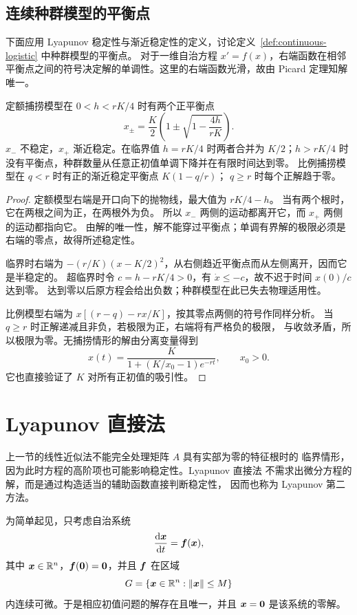 \subsection*{连续种群模型的平衡点}
下面应用 Lyapunov 稳定性与渐近稳定性的定义，讨论定义~\ref{def:continuous-logistic} 中种群模型的平衡点。
对于一维自治方程 $x'=f(x)$，右端函数在相邻平衡点之间的符号决定解的单调性。这里的右端函数光滑，故由 Picard 定理知解唯一。
\begin{proposition}[捕捞阈值]\label{prop:harvest-threshold}
定额捕捞模型在 $0<h<rK/4$ 时有两个正平衡点
\[
 x_\pm=\frac K2\left(1\pm\sqrt{1-\frac{4h}{rK}}\right).
\]
$x_-$ 不稳定，$x_+$ 渐近稳定。在临界值 $h=rK/4$ 时两者合并为
$K/2$；$h>rK/4$ 时没有平衡点，种群数量从任意正初值单调下降并在有限时间达到零。
比例捕捞模型在 $q<r$ 时有正的渐近稳定平衡点 $K(1-q/r)$；
$q\geq r$ 时每个正解趋于零。
\end{proposition}
\begin{proof}
定额模型右端是开口向下的抛物线，最大值为 $rK/4-h$。
当有两个根时，它在两根之间为正，在两根外为负。
所以 $x_-$ 两侧的运动都离开它，而 $x_+$ 两侧的运动都指向它。
由解的唯一性，解不能穿过平衡点；单调有界解的极限必须是右端的零点，故得所述稳定性。

临界时右端为 $-(r/K)(x-K/2)^2$，从右侧趋近平衡点而从左侧离开，因而它是半稳定的。
超临界时令 $c=h-rK/4>0$，有 $\dot x\leq-c$，故不迟于时间 $x(0)/c$ 达到零。
达到零以后原方程会给出负数；种群模型在此已失去物理适用性。

比例模型右端为 $x[(r-q)-rx/K]$，按其零点两侧的符号作同样分析。
当 $q\geq r$ 时正解递减且非负，若极限为正，右端将有严格负的极限，
与收敛矛盾，所以极限为零。无捕捞情形的解由分离变量得到
\[
 x(t)=\frac{K}{1+(K/x_0-1)e^{-rt}},\qquad x_0>0.
\]
它也直接验证了 $K$ 对所有正初值的吸引性。
\end{proof}

\section{Lyapunov 直接法}\label{sec:Lyapunov直接法}

上一节的线性近似法不能完全处理矩阵 $A$ 具有实部为零的特征根时的
临界情形，因为此时方程的高阶项也可能影响稳定性。Lyapunov 直接法
不需求出微分方程的解，而是通过构造适当的辅助函数直接判断稳定性，
因而也称为 Lyapunov 第二方法。

为简单起见，只考虑自治系统
\[
	\dfrac{\mathrm{d}\boldsymbol{x}}{\mathrm{d} t}=\boldsymbol{f}(\boldsymbol{x}),
\]
其中 $\boldsymbol{x}\in\mathbb{R}^n$，$\boldsymbol{f}(\boldsymbol{0})=\boldsymbol{0}$，并且
$\boldsymbol{f}$ 在区域
\[
	G=\left\{
	\boldsymbol{x}\in\mathbb{R}^n:\left\| \boldsymbol{x} \right\|\leq M
	\right\}
\]
内连续可微。于是相应初值问题的解存在且唯一，并且
$\boldsymbol{x}=\boldsymbol{0}$ 是该系统的零解。

